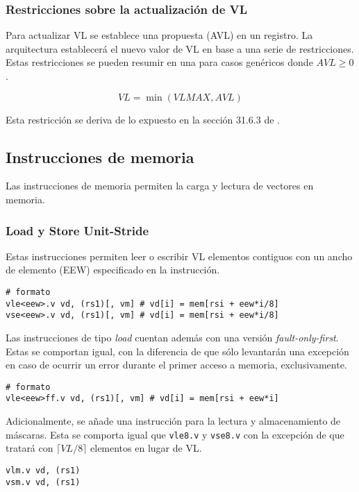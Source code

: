 \subsubsection{Restricciones sobre la actualización de VL}
Para actualizar VL se establece una propuesta (AVL) en un registro. La
arquitectura establecerá el nuevo valor de VL en base a una serie de
restricciones. Estas restricciones se pueden resumir en una para casos
genéricos donde $AVL \ge 0$.

$$VL = \min(VLMAX, AVL)$$

Esta restricción se deriva de lo expuesto en la sección 31.6.3 de \cite{riscv-isa2024}.

\subsection{Instrucciones de memoria}
Las instrucciones de memoria permiten la carga y lectura de vectores en memoria.

\subsubsection{Load y Store Unit-Stride}
Estas instrucciones permiten leer o escribir VL elementos contiguos con un
ancho de elemento (EEW) especificado en la instrucción.

\begin{lstlisting}
# formato
vle<eew>.v vd, (rs1)[, vm] # vd[i] = mem[rsi + eew*i/8]
vse<eew>.v vd, (rs1)[, vm] # vd[i] = mem[rsi + eew*i/8]
\end{lstlisting}

Las instrucciones de tipo \textit{load} cuentan además con una versión
\textit{fault-only-first}. Estas se comportan igual, con la diferencia de que
sólo levantarán una excepción en caso de ocurrir un error durante el primer
acceso a memoria, exclusivamente.

\begin{lstlisting}
# formato
vle<eew>ff.v vd, (rs1)[, vm] # vd[i] = mem[rsi + eew*i]
\end{lstlisting}

Adicionalmente, se añade una instrucción para la lectura y almacenamiento de
máscaras. Esta se comporta igual que \texttt{vle8.v} y \texttt{vse8.v} con la
excepción de que tratará con $\lceil VL / 8\rceil$ elementos en lugar de VL.

\begin{lstlisting}
vlm.v vd, (rs1)
vsm.v vd, (rs1)
\end{lstlisting}


